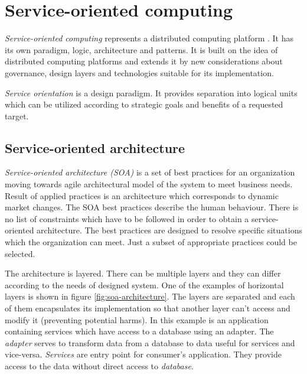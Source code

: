 \chapter{Service-oriented computing}
\label{chap:service-oriented computing}
\emph{Service-oriented computing} represents a distributed computing platform \cite{soa-contract}. It has its own paradigm, logic, architecture and patterns. It is built on the idea of distributed computing platforms and extends it by new considerations about governance, design layers and technologies suitable for its implementation.

\emph{Service orientation} is a design paradigm. It provides separation into logical units which can be utilized according to strategic goals and benefits of a requested target.

\section{Service-oriented architecture}
\emph{Service-oriented architecture (SOA)} is a set of best practices for an organization moving towards \gls{agile} architectural model of the system to meet business needs. Result of applied practices is an architecture which corresponds to dynamic market changes. The SOA best practices describe the human behaviour. There is no list of constraints which have to be followed in order to obtain a service-oriented architecture. The best practices are designed to resolve specific situations which the organization can meet. Just a subset of appropriate practices could be selected.\par

The architecture is layered. There can be multiple layers and they can differ according to the needs of designed system. One of the examples of horizontal layers is shown in figure \ref{fig:soa-architecture}. The layers are separated and each of them encapsulates its implementation so that another layer can't access and modify it (preventing potential harms). In this example is an application containing services which have access to a database using an adapter. The \textit{\gls{adapter}} serves to transform data from a database to data useful for services and vice-versa. \textit{Services} are entry point for consumer's application. They provide access to the data without direct access to \textit{database}.

